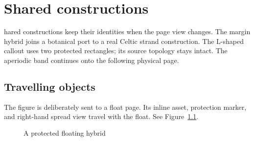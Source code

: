 \chapter[Shared constructions]{Shared constructions}\label{chap:shared}
\florilegiumreserve[0pt]{.7cm}{9cm}{.6cm}{3cm}
\florilegiumreserve[0pt]{1.3cm}{9cm}{1.2cm}{.6cm}
hared constructions keep their identities when the page view changes.
The margin hybrid joins a botanical port to a real Celtic strand construction.
The L-shaped callout uses two protected rectangles; its source topology stays intact.
The aperiodic band continues onto the following physical page.

\section[Travelling objects]{Travelling objects}
The figure is deliberately sent to a float page. Its inline asset, protection marker,
and right-hand spread view travel with the float. See Figure~\ref{fig:hybrid}.

\begin{figure}[p]
  \begin{florilegiumprotect}[2mm]
    \centering{}
    \caption{A protected floating hybrid}\label{fig:hybrid}
  \end{florilegiumprotect}
\end{figure}
